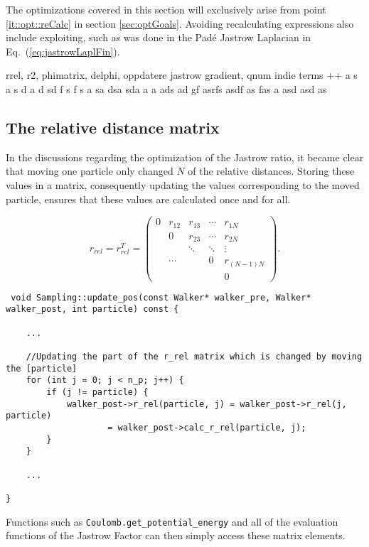 The optimizations covered in this section will exclusively arise from point \ref{it::opt::reCalc} in section \ref{sec:optGoals}. Avoiding recalculating expressions also include exploiting, such as was done in the Padé Jastrow Laplacian in Eq.~(\ref{eq:jastrowLaplFin}).

rrel, r2, phimatrix, delphi, oppdatere jastrow gradient, qnum indie terms ++ a s a s d a d sd f s f s a sa dsa sda a a  ads ad  gf asrfs asdf as fas  a asd asd as 



\subsection{The relative distance matrix}

In the discussions regarding the optimization of the Jastrow ratio, it became clear that moving one particle only changed $N$ of the relative distances. Storing these values in a matrix, consequently updating the values corresponding to the moved particle, ensures that these values are calculated once and for all.

\begin{equation}
r_{rel} = r_{rel}^T = \left( \begin{array}{ccccc}
0 & r_{12} & r_{13} & \cdots & r_{1N} \\
 & 0 & r_{23} & \cdots & r_{2N}  \\
 &  & \ddots & \ddots & \vdots \\
 & \cdots &  & 0 & r_{(N-1)N} \\
 &  &  &  & 0\end{array} \right).
\end{equation}

\begin{lstlisting}
 void Sampling::update_pos(const Walker* walker_pre, Walker* walker_post, int particle) const {

    ...

    //Updating the part of the r_rel matrix which is changed by moving the [particle]
    for (int j = 0; j < n_p; j++) {
        if (j != particle) {
            walker_post->r_rel(particle, j) = walker_post->r_rel(j, particle)
                    = walker_post->calc_r_rel(particle, j);
        }
    }
    
    ...

}
\end{lstlisting}


Functions such as \verb+Coulomb.get_potential_energy+ and all of the evaluation functions of the Jastrow Factor can then simply access these matrix elements.

